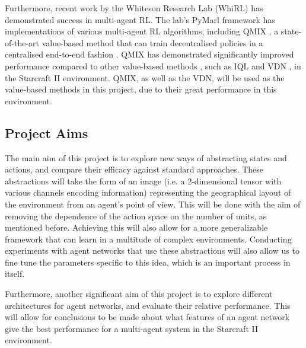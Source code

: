Furthermore, recent work by the Whiteson Research Lab (WhiRL) has demonstrated success in multi-agent RL. The lab's PyMarl framework has implementations of various multi-agent RL algorithms, including QMIX \cite{qmix}, a state-of-the-art value-based method that can train decentralised policies in a centralised end-to-end fashion \cite{qmix}. QMIX has demonstrated significantly improved performance compared to other value-based methods \cite{qmix}, such as IQL \cite{IQL} and VDN \cite{vdn}, in the Starcraft II environment. QMIX, as well as the VDN, will be used as the value-based methods in this project, due to their great performance in this environment.

\subsection{Project Aims}

The main aim of this project is to explore new ways of abstracting states and actions, and compare their efficacy against standard approaches. These abstractions will take the form of an image (i.e. a 2-dimensional tensor with various channels encoding information) representing the geographical layout of the environment from an agent's point of view. This will be done with the aim of removing the dependence of the action space on the number of units, as mentioned before. Achieving this will also allow for a more generalizable framework that can learn in a multitude of complex environments. Conducting experiments with agent networks that use these abstractions will also allow us to fine tune the parameters specific to this idea, which is an important process in itself.

Furthermore, another significant aim of this project is to explore different architectures for agent networks, and evaluate their relative performance. This will allow for conclusions to be made about what features of an agent network give the best performance for a multi-agent system in the Starcraft II environment.

